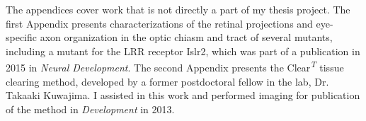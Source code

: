 The appendices cover work that is not directly a part of my thesis project.
The first Appendix presents characterizations of the retinal projections and eye-specific axon organization in the optic chiasm and tract of several mutants, including a mutant for the LRR receptor Islr2, which was part of a publication in 2015 in \emph{Neural Development}.
The second Appendix presents the Clear\textsuperscript{\emph{T}} tissue clearing method, developed by a former postdoctoral fellow in the lab, Dr. Takaaki Kuwajima.
I assisted in this work and performed imaging for publication of the method in \emph{Development} in 2013.

